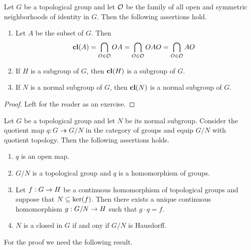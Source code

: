 \documentclass[10pt]{amsart}
\begin{document}
\begin{fact}\label{fact:closures_in_topological_groups}
	Let $G$ be a topological group and let ${\mathcal O}$ be the family of all open and symmetric neighborhoods of identity in $G$. Then the following assertions hold.
	\begin{enumerate}[label=\emph{\textbf{(\arabic*)}}, leftmargin=*]
		\item Let $A$ be the subset of $G$. Then
		      $$\mathbf{cl}(A) = \bigcap_{O \in {\mathcal O}}OA = \bigcap_{O \in {\mathcal O}}OAO = \bigcap_{O \in {\mathcal O}}AO$$
		\item If $H$ is a subgroup of $G$, then $\mathbf{cl}(H)$ is a subgroup of $G$.
		\item If $N$ is a normal subgroup of $G$, then $\mathbf{cl}(N)$ is a normal subgroup of $G$.
	\end{enumerate}
\end{fact}
\begin{proof}
	Left for the reader as an exercise.
\end{proof}

\begin{theorem}\label{theorem:quotients_of_topological_groups}
	Let $G$ be a topological group and let $N$ be its normal subgroup. Consider the quotient map $q:G\twoheadrightarrow G/N$ in the category of groups and equip $G/N$ with quotient topology. Then the following assertions holds.
	\begin{enumerate}[label=\emph{\textbf{(\arabic*)}}, leftmargin=*]
		\item $q$ is an open map.
		\item $G/N$ is a topological group and $q$ is a homomorphism of groups.
		\item Let $f:G\rightarrow H$ be a continuous homomorphism of topological groups and suppose that $N \subseteq \mathrm{ker}(f)$. Then there exists a unique continuous homomorphism $g:G/N\rightarrow H$ such that $g\cdot q = f$.
		\item $N$ is a closed in $G$ if and ony if $G/N$ is Hausdorff.
	\end{enumerate}
\end{theorem}
\noindent
For the proof we need the following result.
\end{document}
